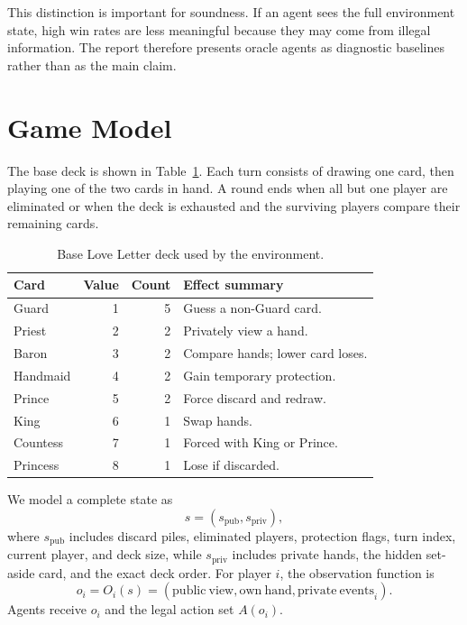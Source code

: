 \documentclass[10pt,twocolumn]{article}
\begin{document}
This distinction is important for soundness. If an agent sees the full
environment state, high win rates are less meaningful because they may come
from illegal information. The report therefore presents oracle agents as
diagnostic baselines rather than as the main claim.

\section{Game Model}

The base deck is shown in Table~\ref{tab:deck}. Each turn consists of drawing
one card, then playing one of the two cards in hand. A round ends when all but
one player are eliminated or when the deck is exhausted and the surviving
players compare their remaining cards.

\begin{table}[t]
\centering
\caption{Base Love Letter deck used by the environment.}
\label{tab:deck}
\begin{tabular}{lrrp{}}
\toprule
Card & Value & Count & Effect summary\\
\midrule
Guard & 1 & 5 & Guess a non-Guard card.\\
Priest & 2 & 2 & Privately view a hand.\\
Baron & 3 & 2 & Compare hands; lower card loses.\\
Handmaid & 4 & 2 & Gain temporary protection.\\
Prince & 5 & 2 & Force discard and redraw.\\
King & 6 & 1 & Swap hands.\\
Countess & 7 & 1 & Forced with King or Prince.\\
Princess & 8 & 1 & Lose if discarded.\\
\bottomrule
\end{tabular}
\end{table}

We model a complete state as
\begin{equation}
s = (s_{\mathrm{pub}}, s_{\mathrm{priv}}),
\end{equation}
where $s_{\mathrm{pub}}$ includes discard piles, eliminated players,
protection flags, turn index, current player, and deck size, while
$s_{\mathrm{priv}}$ includes private hands, the hidden set-aside card, and
the exact deck order. For player $i$, the observation function is
\begin{equation}
o_i = O_i(s) =
(\mathrm{public\ view}, \mathrm{own\ hand}, \mathrm{private\ events}_i).
\end{equation}
Agents receive $o_i$ and the legal action set $A(o_i)$.
\end{document}
